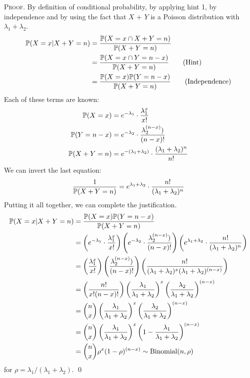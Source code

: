 \medskip\noindent\textsc{Proof}.
By definition of conditional probability, by applying hint 1, by independence and
by using the fact that $X$ + $Y$ is a Poisson distribution with $\lambda_1 + \lambda_2$.
\begin{align*}
    \P(X = x | X + Y = n) &= \frac{\P(X = x \cap X + Y = n)}{\P(X + Y = n)} \\
    &= \frac{\P(X = x \cap Y = n - x)}{\P(X + Y = n)} \tag{Hint}\\
    &= \frac{\P(X = x)\P(Y = n - x)}{\P(X + Y = n)} \tag{Independence}
\end{align*}
Each of these terms are known:
\begin{align*}
\P(X = x) &= e^{-\lambda_1}\cdot\frac{\lambda_1^x}{x!} \\
\P(Y = n - x) &= e^{-\lambda_2}\cdot\frac{\lambda_2^{(n-x)})}{(n-x)!} \\
\P(X + Y = n) &= e^{-(\lambda_1 + \lambda_2)}\cdot\frac{(\lambda_1 + \lambda_2)^n}{n!} 
\end{align*}
We can invert the last equation:
$$
\frac{1}{\P(X + Y = n)} = e^{\lambda_1 + \lambda_2}\cdot\frac{n!}{(\lambda_1 + \lambda_2)^n} 
$$
Putting it all together, we can complete the justification.
\begin{align*}
    \P(X = x | X + Y = n) &= \frac{\P(X = x)\P(Y = n - x)}{\P(X + Y = n)} \\
    &= \left(e^{-\lambda_1}\cdot\frac{\lambda_1^x}{x!}\right)
    \left(e^{-\lambda_2}\cdot\frac{\lambda_2^{(n-x)})}{(n-x)!}\right)
    \left(e^{\lambda_1 + \lambda_2}\cdot\frac{n!}{(\lambda_1 + \lambda_2)^n} \right) \\
    &= \left(\frac{\lambda_1^x}{x!}\right)
    \left(\frac{\lambda_2^{(n-x)})}{(n-x)!}\right)
    \left(\frac{n!}{(\lambda_1 + \lambda_2)^x(\lambda_1 + \lambda_2)^{(n-x)}} \right) \\
    &= \left(\frac{n!}{x!(n-x)!}\right)
    \left(\frac{\lambda_1}{\lambda_1 + \lambda_2}\right)^x
    \left(\frac{\lambda_2}{\lambda_1 + \lambda_2}\right)^{(n-x)} \\
    &= {n\choose x}
    \left(\frac{\lambda_1}{\lambda_1 + \lambda_2}\right)^x
    \left(\frac{\lambda_2}{\lambda_1 + \lambda_2}\right)^{(n-x)} \\
    &= {n\choose x}
    \left(\frac{\lambda_1}{\lambda_1 + \lambda_2}\right)^x
    \left(1 - \frac{\lambda_1}{\lambda_1 + \lambda_2}\right)^{(n-x)} \\
    &= {n\choose x}
    \rho^x
    (1 - \rho)^{(n-x)}   \sim \text{Binomial}(n, \rho)
\end{align*}
for $\rho = \lambda_1/(\lambda_1 + \lambda_2)$. \qed


